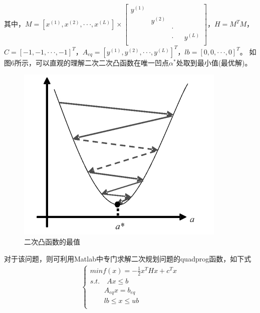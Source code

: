\documentclass[12pt,a4paper]{article}%
\begin{document}
	其中，$M=\left[{x}^{(1)},{x}^{(2)},···,{x}^{(L)}\right]×\left[ \begin{array}{cccc}   %
		{y}^{(1)} & \quad & \quad & \quad\\  %
		\quad & {y}^{(2)} & \quad & \quad\\  %
		\quad & \quad & · & \quad  \\  %
		\quad & \quad & · & {y}^{(L)}  \\  %
	\end{array} 
	\right]$，$H={M}^{T}M$，$C={[-1,-1,···,-1]}^{T}$，${A}_{eq}={[{y}^{(1)},{y}^{(2)},···,{y}^{(L)}]}^{T}$，$lb={[0,0,···,0]}^{T}$。
	如图6所示，可以直观的理解二次二次凸函数在唯一凹点${\alpha}^{*}$处取到最小值(最优解)。
	\begin{figure}[H]%
		\centering
		\begin{minipage}{0.6\textwidth}%
			\centering
			\includegraphics[width=0.8%
			\textwidth]{figure8}%
			\caption{\fontsize{10pt}{15pt}\selectfont 二次凸函数的最值}%
		\end{minipage}
	\end{figure}
	
	对于该问题，则可利用Matlab中专门求解二次规划问题的quadprog函数，如下式
	\begin{align}
		\begin{cases} min f(x)=-\frac{1}{2}{x}^{T}H{x}+{c}^{T}x   \\ 
			s.t.\quad	Ax\leq b\\
			\qquad {A}_{eq}x={b}_{eq}    \\
			\qquad lb\leq x \leq ub\\\end{cases} 
	\end{align}
	
\end{document}
